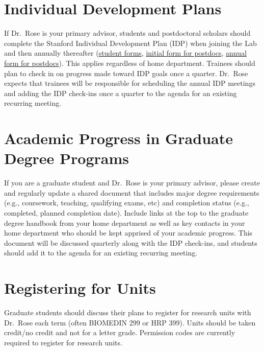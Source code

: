 \documentclass[
]{book}
\begin{document}
\hypertarget{individual-development-plans}{%
\section{Individual Development Plans}\label{individual-development-plans}}

If Dr.~Rose is your primary advisor, students and postdoctoral scholars should complete the Stanford Individual Development Plan (IDP) when joining the Lab and then annually thereafter (\href{https://oge.stanford.edu/academics/idp/forms/}{student forms}, \href{https://postdocs.stanford.edu/sites/default/files/opa_idp-initial_0.pdf}{initial form for postdocs}, \href{https://postdocs.stanford.edu/sites/default/files/opa_idp-annual_0.pdf}{annual form for postdocs}). This applies regardless of home department. Trainees should plan to check in on progress made toward IDP goals once a quarter. Dr.~Rose expects that trainees will be responsible for scheduling the annual IDP meetings and adding the IDP check-ins once a quarter to the agenda for an existing recurring meeting.

\hypertarget{academic-progress-in-graduate-degree-programs}{%
\section{Academic Progress in Graduate Degree Programs}\label{academic-progress-in-graduate-degree-programs}}

If you are a graduate student and Dr.~Rose is your primary advisor, please create and regularly update a shared document that includes major degree requirements (e.g., coursework, teaching, qualifying exams, etc) and completion status (e.g., completed, planned completion date). Include links at the top to the graduate degree handbook from your home department as well as key contacts in your home department who should be kept apprised of your academic progress. This document will be discussed quarterly along with the IDP check-ins, and students should add it to the agenda for an existing recurring meeting.

\hypertarget{registering-for-units}{%
\section{Registering for Units}\label{registering-for-units}}

Graduate students should discuss their plans to register for research units with Dr.~Rose each term (often BIOMEDIN 299 or HRP 399). Units should be taken credit/no credit and not for a letter grade. Permission codes are currently required to register for research units.
\end{document}
